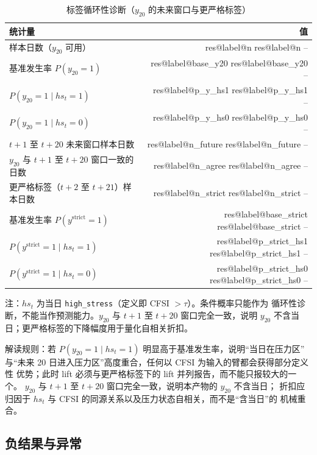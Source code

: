 \documentclass[UTF8,fontset=fandol,11pt,a4paper]{ctexart}
\makeatletter
\newcommand{\RESULT}[2]{%
  \ifcsname res@#1@#2\endcsname
    \csname res@#1@#2\endcsname
  \else
    --%
  \fi}
\makeatother
\begin{document}
\begin{table}[t]
\centering
\caption{标签循环性诊断（$y_{20}$ 的未来窗口与更严格标签）}
\label{tab:circularity}
\footnotesize
\begin{tabular}{lr}
\toprule
统计量 & 值 \\
\midrule
样本日数（$y_{20}$ 可用） & \RESULT{label}{n} \\
基准发生率 $P(y_{20}=1)$ & \RESULT{label}{base_y20} \\
$P(y_{20}=1\mid hs_t=1)$ & \RESULT{label}{p_y_hs1} \\
$P(y_{20}=1\mid hs_t=0)$ & \RESULT{label}{p_y_hs0} \\
$t+1$ 至 $t+20$ 未来窗口样本日数 & \RESULT{label}{n_future} \\
$y_{20}$ 与 $t+1$ 至 $t+20$ 窗口一致的日数 & \RESULT{label}{n_agree} \\
更严格标签（$t+2$ 至 $t+21$）样本日数 & \RESULT{label}{n_strict} \\
基准发生率 $P(y^{\mathrm{strict}}=1)$ & \RESULT{label}{base_strict} \\
$P(y^{\mathrm{strict}}=1\mid hs_t=1)$ & \RESULT{label}{p_strict_hs1} \\
$P(y^{\mathrm{strict}}=1\mid hs_t=0)$ & \RESULT{label}{p_strict_hs0} \\
\bottomrule
\end{tabular}
\par\smallskip
\raggedright\scriptsize
注：$hs_t$ 为当日 \texttt{high\_stress}（定义即 CFSI $>\tau$）。条件概率只能作为
循环性诊断，不能当作预测能力。$y_{20}$ 与 $t+1$ 至 $t+20$ 窗口完全一致，说明
$y_{20}$ 不含当日；更严格标签的下降幅度用于量化自相关折扣。
\end{table}

解读规则：若 $P(y_{20}=1\mid hs_t=1)$ 明显高于基准发生率，说明“当日在压力区”
与“未来 20 日进入压力区”高度重合，任何以 CFSI 为输入的臂都会获得部分定义性
优势；此时 lift 必须与更严格标签下的 lift 并列报告，而不能只报较大的一个。
$y_{20}$ 与 $t+1$ 至 $t+20$ 窗口完全一致，说明本产物的 $y_{20}$ 不含当日；
折扣应归因于 $hs_t$ 与 CFSI 的同源关系以及压力状态自相关，而不是“含当日”的
机械重合。

\subsection{负结果与异常}
\end{document}
